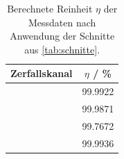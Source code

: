 \begin{table}[H]
    \caption{Berechnete Reinheit $\eta$ der Messdaten nach Anwendung der Schnitte aus \autoref{tab:schnitte}.}
    \begin{center}
        \begin{tabular}{|c|c|}
            \hline
   Zerfallskanal   	& $\eta$ / \%	\\ \hline
   \Zee				& 99.9922		\\ \hline
   \Zmm				& 99.9871		\\ \hline
   \Ztt				& 99.7672		\\ \hline
   \Zqq				& 99.9936		\\ \hline

        \end{tabular}
    \end{center}
    \label{tab:reinheiten}
\end{table}

